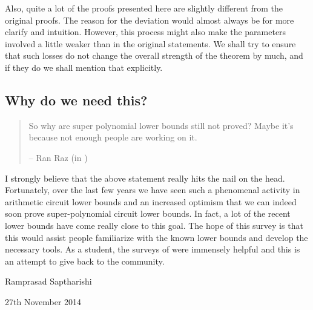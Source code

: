Also, quite a lot of the proofs presented here are slightly different from the original proofs. The reason for the deviation would almost always be for more clarify and intuition. However, this process might also make the parameters involved a little weaker than in the original statements. We shall try to ensure that such losses do not change the overall strength of the theorem by much, and if they do we shall mention that explicitly. \\

\subsection*{Why do we need this?}

\begin{quote}
So why are super polynomial lower bounds still not proved?  Maybe it's because not enough people are working on it.  
\begin{flushright}
-- Ran Raz (in \cite{raz10fool})
\end{flushright}
\end{quote}


I strongly believe that the above statement really hits the nail on the head. Fortunately, over the last few years we have seen such a phenomenal activity in arithmetic circuit lower bounds and an increased optimism that we can indeed soon prove super-polynomial circuit lower bounds. In fact, a lot of the recent lower bounds have come really close to this goal. The hope of this survey is that this would assist people familiarize with the known lower bounds and develop the necessary tools. As a student, the surveys of \cite{sy,ckw11} were immensely helpful and this is an attempt to give back to the community. 

\vspace*{2cm}

\noindent
Ramprasad Saptharishi

\noindent
27th November 2014

\noindent 
\currentrevision

